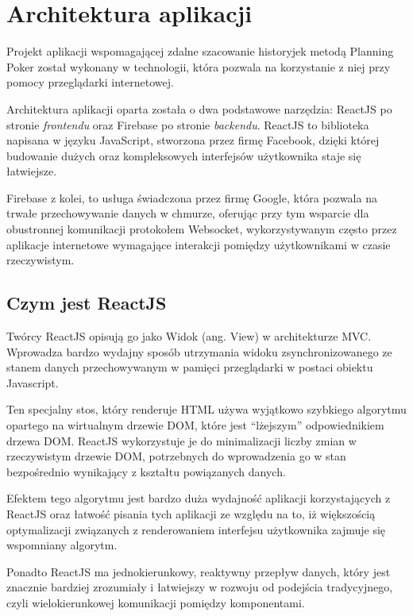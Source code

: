 ﻿%

\chapter{Architektura aplikacji}

Projekt aplikacji wspomagającej zdalne szacowanie historyjek metodą Planning Poker
został wykonany w technologii, która pozwala na korzystanie z niej przy pomocy przeglądarki internetowej.

Architektura aplikacji oparta została o dwa podstawowe narzędzia:
ReactJS po stronie \textit{frontendu} oraz Firebase po stronie \textit{backendu}.
ReactJS to biblioteka napisana w języku JavaScript, stworzona przez firmę Facebook,
dzięki której budowanie dużych oraz kompleksowych interfejsów użytkownika staje się łatwiejsze.

Firebase z kolei, to usługa świadczona przez firmę Google, która
pozwala na trwałe przechowywanie danych w chmurze, oferując przy tym
wsparcie dla obustronnej komunikacji protokołem Websocket, wykorzystywanym często
przez aplikacje internetowe wymagające interakcji pomiędzy użytkownikami w czasie rzeczywistym.

\section{Czym jest ReactJS}

Twórcy ReactJS opisują go jako Widok (ang. View) w architekturze MVC\@.
Wprowadza bardzo wydajny sposób utrzymania widoku zsynchronizowanego ze stanem danych
przechowywanym w pamięci przeglądarki w postaci obiektu Javascript.

Ten specjalny stos, który renderuje HTML używa wyjątkowo szybkiego algorytmu opartego na wirtualnym drzewie DOM,
które jest ``lżejszym'' odpowiednikiem drzewa DOM\@. ReactJS wykorzystuje je
do minimalizacji liczby zmian w rzeczywistym drzewie DOM, potrzebnych do wprowadzenia go
w stan bezpośrednio wynikający z kształtu powiązanych danych.

Efektem tego algorytmu jest bardzo duża wydajność aplikacji korzystających z ReactJS oraz
łatwość pisania tych aplikacji ze względu na to, iż większością optymalizacji związanych
z renderowaniem interfejsu użytkownika zajmuje się wspomniany algorytm.

Ponadto ReactJS ma jednokierunkowy, reaktywny przepływ danych,
który jest znacznie bardziej zrozumiały i łatwiejszy w rozwoju od podejścia tradycyjnego,
czyli wielokierunkowej komunikacji pomiędzy komponentami.

